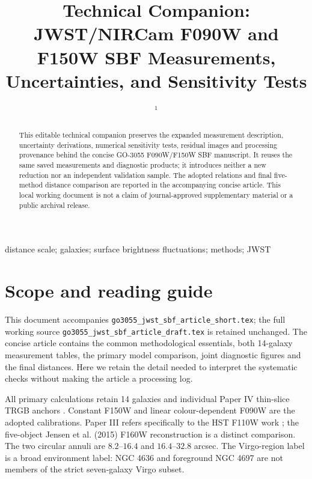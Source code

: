 \documentclass[nodoi,nocopyright]{pas}
\begin{document}
\renewcommand{\doitext}{}
\title{Technical Companion: JWST/NIRCam F090W and F150W SBF Measurements,
Uncertainties, and Sensitivity Tests}
\author{ $^1$}
\begin{abstract}
This editable technical companion preserves the expanded measurement
description, uncertainty derivations, numerical sensitivity tests, residual
images and processing provenance behind the concise GO-3055 F090W/F150W
SBF manuscript. It reuses the same saved measurements and diagnostic
products; it introduces neither a new reduction nor an independent
validation sample. The adopted relations and final five-method distance
comparison are reported in the accompanying concise article. This local
working document is not a claim of journal-approved supplementary material
or a public archival release.
\end{abstract}
\begin{keywords}
distance scale; galaxies; surface brightness fluctuations; methods; JWST
\end{keywords}
\maketitle\endgroup
\renewcommand{\thesection}{S\arabic{section}}
\renewcommand{\theequation}{S\arabic{equation}}
\renewcommand{\thefigure}{S\arabic{figure}}
\renewcommand{\thetable}{S\arabic{table}}

\section{Scope and reading guide}
This document accompanies
\nolinkurl{go3055_jwst_sbf_article_short.tex}; the full working source
\nolinkurl{go3055_jwst_sbf_article_draft.tex} is retained unchanged.
The concise article contains the common methodological essentials, both
14-galaxy measurement tables, the primary model comparison, joint diagnostic
figures and the final distances. Here we retain the detail needed to
interpret the systematic checks without making the article a processing log.

All primary calculations retain 14 galaxies and individual Paper IV
thin-slice TRGB anchors \citep{Chazov2026}. Constant F150W and linear
colour-dependent F090W are the adopted calibrations. Paper III refers
specifically to the HST F110W work \citep{Jensen2025}; the five-object
Jensen et al. (2015) F160W reconstruction is a distinct comparison.
The two circular annuli are $8.2$--$16.4$ and $16.4$--$32.8$ arcsec.
The Virgo-region label is a broad environment label: NGC 4636 and foreground
NGC 4697 are not members of the strict seven-galaxy Virgo subset.
\end{document}
